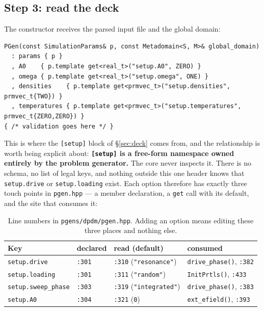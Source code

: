 \documentclass[11pt,a4paper]{article}
\newcommand{\code}[1]{\texttt{\small #1}}
\begin{document}
\subsection{Step 3: read the deck}

The constructor receives the parsed input file and the global domain:

\begin{lstlisting}
PGen(const SimulationParams& p, const Metadomain<S, M>& global_domain)
  : params { p }
  , A0    { p.template get<real_t>("setup.A0", ZERO) }
  , omega { p.template get<real_t>("setup.omega", ONE) }
  , densities    { p.template get<prmvec_t>("setup.densities",    prmvec_t{TWO}) }
  , temperatures { p.template get<prmvec_t>("setup.temperatures", prmvec_t{ZERO,ZERO}) }
{ /* validation goes here */ }
\end{lstlisting}

This is where the \code{[setup]} block of \S\ref{sec:deck} comes from, and the
relationship is worth being explicit about: \textbf{\code{[setup]} is a free-form
namespace owned entirely by the problem generator.} The core never inspects it. There
is no schema, no list of legal keys, and nothing outside this one header knows that
\code{setup.drive} or \code{setup.loading} exist. Each option therefore has exactly
three touch points in \code{pgen.hpp} --- a member declaration, a \code{get} call with
its default, and the site that consumes it:

\begin{table}[h]
\centering\small
\begin{tabular}{@{}llll@{}}
\toprule
Key & declared & read (default) & consumed \\
\midrule
\code{setup.drive}       & \code{:301} & \code{:310} (\code{"resonance"})  & \code{drive\_phase()}, \code{:382} \\
\code{setup.loading}     & \code{:301} & \code{:311} (\code{"random"})     & \code{InitPrtls()}, \code{:433} \\
\code{setup.sweep\_phase}& \code{:303} & \code{:319} (\code{"integrated"}) & \code{drive\_phase()}, \code{:383} \\
\code{setup.A0}          & \code{:304} & \code{:321} (\code{0})            & \code{ext\_efield()}, \code{:393} \\
\bottomrule
\end{tabular}
\caption{Line numbers in \code{pgens/dpdm/pgen.hpp}. Adding an option means editing
these three places and nothing else.}
\end{table}
\end{document}
